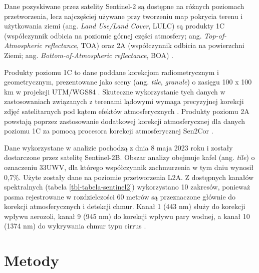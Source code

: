\documentclass{amuthesis}
\begin{document}
Dane pozyskiwane przez satelity Sentinel-2 są dostępne na różnych
poziomach przetworzenia, lecz najczęściej używane przy tworzeniu map
pokrycia terenu i użytkowania ziemi (ang. \emph{Land Use/Land Cover},
LULC) są produkty 1C (współczynnik odbicia na poziomie górnej części
atmosfery; ang. \emph{Top-of-Atmospheric reflectance}, TOA) oraz 2A
(współczynnik odbicia na powierzchni Ziemi; ang.
\emph{Bottom-of-Atmospheric reflectance}, BOA)
\autocite{phiri_2020_sentinel2}.

Produkty poziomu 1C to dane poddane korekcjom radiometrycznym i
geometrycznym, prezentowane jako sceny (ang. \emph{tile},
\emph{granule}) o zasięgu 100 x 100 km w projekcji UTM/WGS84
\autocite{esa_2015_sentinel2handbook}. Skuteczne wykorzystanie tych
danych w zastosowaniach związanych z terenami lądowymi wymaga
precyzyjnej korekcji zdjęć satelitarnych pod kątem efektów
atmosferycznych \autocite{main-knorn_2017_Sen2Cor}. Produkty poziomu 2A
powstają poprzez zastosowanie dodatkowej korekcji atmosferycznej dla
danych poziomu 1C za pomocą procesora korekcji atmosferycznej Sen2Cor
\autocite{main-knorn_2017_Sen2Cor}.

Dane wykorzystane w analizie pochodzą z dnia 8 maja 2023 roku i zostały
dostarczone przez satelitę Sentinel-2B. Obszar analizy obejmuje kafel
(ang. \emph{tile}) o oznaczeniu 33UWV, dla którego współczynnik
zachmurzenia w tym dniu wynosił 0,7\%. Użyte zostały dane na poziomie
przetworzenia L2A. Z dostępnych kanałów spektralnych (tabela
\ref{tbl-tabela-sentinel2}) wykorzystano 10 zakresów, ponieważ pasma
rejestrowane w rozdzielczości 60 metrów są przeznaczone głównie do
korekcji atmosferycznych i detekcji chmur. Kanał 1 (443 nm) służy do
korekcji wpływu aerozoli, kanał 9 (945 nm) do korekcji wpływu pary
wodnej, a kanał 10 (1374 nm) do wykrywania chmur typu cirrus
\autocite{drusch_2012_sen2GMES}.


\hypertarget{sec-metody}{%
\chapter{Metody}\label{sec-metody}}
\end{document}
